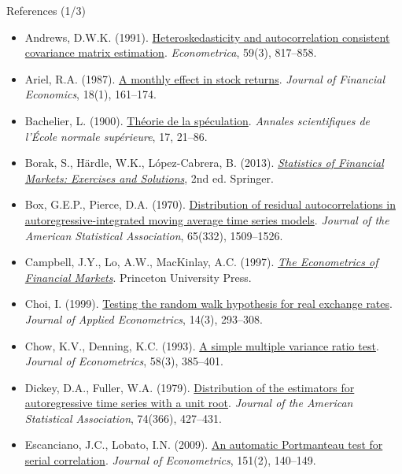 \begin{frame}{References (1/3)}
\itemsize{\tiny}
\begin{itemize}
    \item Andrews, D.W.K. (1991). \href{https://doi.org/10.2307/2938229}{Heteroskedasticity and autocorrelation consistent covariance matrix estimation}. \textit{Econometrica}, 59(3), 817--858.
    \item Ariel, R.A. (1987). \href{https://doi.org/10.1016/0304-405X(87)90066-3}{A monthly effect in stock returns}. \textit{Journal of Financial Economics}, 18(1), 161--174.
    \item Bachelier, L. (1900). \href{https://doi.org/10.24033/asens.476}{Théorie de la spéculation}. \textit{Annales scientifiques de l'École normale supérieure}, 17, 21--86.
    \item Borak, S., Härdle, W.K., López-Cabrera, B. (2013). \href{https://doi.org/10.1007/978-3-642-33929-5}{\textit{Statistics of Financial Markets: Exercises and Solutions}}, 2nd ed. Springer.
    \item Box, G.E.P., Pierce, D.A. (1970). \href{https://doi.org/10.1080/01621459.1970.10481180}{Distribution of residual autocorrelations in autoregressive-integrated moving average time series models}. \textit{Journal of the American Statistical Association}, 65(332), 1509--1526.
    \item Campbell, J.Y., Lo, A.W., MacKinlay, A.C. (1997). \href{https://doi.org/10.1515/9781400830213}{\textit{The Econometrics of Financial Markets}}. Princeton University Press.
    \item Choi, I. (1999). \href{https://doi.org/10.1002/(SICI)1099-1255(199905/06)14:3<293::AID-JAE503>3.0.CO;2-5}{Testing the random walk hypothesis for real exchange rates}. \textit{Journal of Applied Econometrics}, 14(3), 293--308.
    \item Chow, K.V., Denning, K.C. (1993). \href{https://doi.org/10.1016/0304-4076(93)90051-6}{A simple multiple variance ratio test}. \textit{Journal of Econometrics}, 58(3), 385--401.
    \item Dickey, D.A., Fuller, W.A. (1979). \href{https://doi.org/10.1080/01621459.1979.10482531}{Distribution of the estimators for autoregressive time series with a unit root}. \textit{Journal of the American Statistical Association}, 74(366), 427--431.
    \item Escanciano, J.C., Lobato, I.N. (2009). \href{https://doi.org/10.1016/j.jeconom.2009.03.001}{An automatic Portmanteau test for serial correlation}. \textit{Journal of Econometrics}, 151(2), 140--149.

\end{itemize}
\end{frame}
